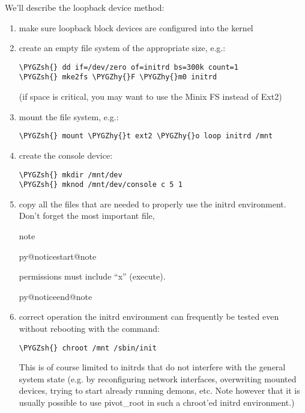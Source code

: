 \documentclass[a4paper,8pt,english]{sphinxmanual}
\makeatletter
\renewenvironment{notice}[2]{%
          \def\py@noticetype{#1}
          \begin{coloredbox}{#1}
          \bf\it
          \par\strong{#2}
          \csname py@noticestart@#1\endcsname
        }
	{
          \csname py@noticeend@\py@noticetype\endcsname
          \end{coloredbox}
        }
\def\PYGZsh{\char`\#}
\def\PYGZhy{\char`\-}
\makeatother
\begin{document}
We'll describe the loopback device method:
\begin{enumerate}
\item {} 
make sure loopback block devices are configured into the kernel

\item {} 
create an empty file system of the appropriate size, e.g.:

\begin{Verbatim}[commandchars=\\\{\}]
\PYGZsh{} dd if=/dev/zero of=initrd bs=300k count=1
\PYGZsh{} mke2fs \PYGZhy{}F \PYGZhy{}m0 initrd
\end{Verbatim}

(if space is critical, you may want to use the Minix FS instead of Ext2)

\item {} 
mount the file system, e.g.:

\begin{Verbatim}[commandchars=\\\{\}]
\PYGZsh{} mount \PYGZhy{}t ext2 \PYGZhy{}o loop initrd /mnt
\end{Verbatim}

\item {} 
create the console device:

\begin{Verbatim}[commandchars=\\\{\}]
\PYGZsh{} mkdir /mnt/dev
\PYGZsh{} mknod /mnt/dev/console c 5 1
\end{Verbatim}

\item {} 
copy all the files that are needed to properly use the initrd
environment. Don't forget the most important file, 

\begin{notice}{note}{Note:}
 permissions must include ``x'' (execute).
\end{notice}

\item {} 
correct operation the initrd environment can frequently be tested
even without rebooting with the command:

\begin{Verbatim}[commandchars=\\\{\}]
\PYGZsh{} chroot /mnt /sbin/init
\end{Verbatim}

This is of course limited to initrds that do not interfere with the
general system state (e.g. by reconfiguring network interfaces,
overwriting mounted devices, trying to start already running demons,
etc. Note however that it is usually possible to use pivot\_root in
such a chroot'ed initrd environment.)


\end{enumerate}
\end{document}
